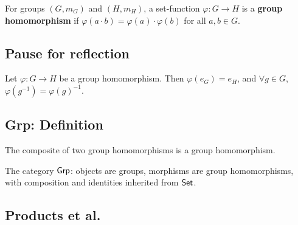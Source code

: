 \begin{definition}
  \label{def:groups:homomorphism}
  \leanok
  For groups $(G, m_G)$ and $(H, m_H)$, a set-function
  $\varphi : G \to H$ is a \textbf{group homomorphism} if
  $\varphi(a \cdot b) = \varphi(a) \cdot \varphi(b)$ for all
  $a, b \in G$.
\end{definition}

\subsection{Pause for reflection}
\label{subsec:groups:pause-for-reflection}

\begin{proposition}
  \label{prop:groups:homo-preserves-identity}
  Let $\varphi : G \to H$ be a group homomorphism. Then
  $\varphi(e_G) = e_H$, and $\forall g \in G$,
  $\varphi(g^{-1}) = \varphi(g)^{-1}$.
\end{proposition}

\subsection{Grp: Definition}
\label{subsec:groups:grp-definition}

\begin{lemma}
  \label{lem:groups:homomorphism-comp}
  The composite of two group homomorphisms is a group homomorphism.
\end{lemma}

\begin{definition}
  \label{def:groups:grp-category}
  The category $\mathsf{Grp}$: objects are groups, morphisms are group
  homomorphisms, with composition and identities inherited from
  $\mathsf{Set}$.
\end{definition}

\subsection{Products et al.}
\label{subsec:groups:products-et-al}

